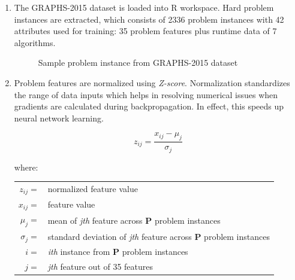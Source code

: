 \begin{enumerate}
	\item The GRAPHS-2015 dataset is loaded into R workspace. Hard problem instances are extracted, which consists of 2336 problem instances with 42 attributes used for training: 35 problem features plus runtime data of 7 algorithms.
	 
	\begin{figure}[H]
		\centering
		\caption{Sample problem instance from GRAPHS-2015 dataset}
		\label{fig:problem_instance}
	\end{figure}

	\item Problem features are normalized using \textit{Z-score}. Normalization standardizes the range of data inputs which helps in resolving numerical issues when gradients are calculated during backpropagation. In effect, this speeds up neural network learning.
	
	\begin{equation}
	z_{ij} = \frac{x_{ij} - \mu_j}{\sigma_j}
	\end{equation} 
	
	where:
	
	\begin{table}[H]
		\centering
		\begin{tabular}{rl}
			$z_{ij} =$ & normalized feature value\\
			$x_{ij} =$ & feature value \\
			$\mu_{j} =$ & mean of \textit{jth} feature across \textbf{P} problem instances \\
			$\sigma_j =$ & standard deviation of \textit{jth} feature across \textbf{P} problem instances \\
			$\mathit{i} =$ & \textit{ith} instance from \textbf{P} problem instances \\
			$\mathit{j} =$ & \textit{jth} feature out of 35 features \\			
		\end{tabular}
	\end{table}


\end{enumerate}
